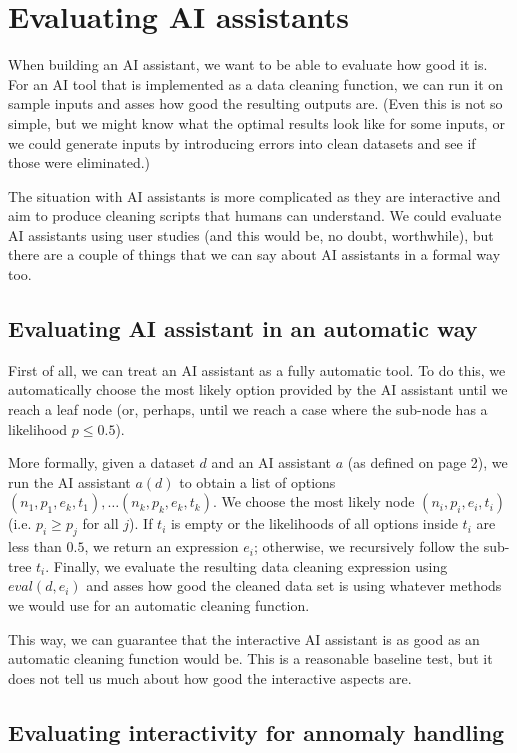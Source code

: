 \documentclass{article}
\begin{document}
\section{Evaluating AI assistants}

When building an AI assistant, we want to be able to evaluate how good it is. For an AI tool that 
is implemented as a data cleaning function, we can run it on sample inputs and asses how good 
the resulting outputs are. (Even this is not so simple, but we might know what the optimal results 
look like for some inputs, or we could generate inputs by introducing errors into clean datasets 
and see if those were eliminated.)

The situation with AI assistants is more complicated as they are interactive and aim to produce
cleaning scripts that humans can understand. We could evaluate AI assistants using user studies 
(and this would be, no doubt, worthwhile), but there are a couple of things that we can say about
AI assistants in a formal way too.

\subsection{Evaluating AI assistant in an automatic way}
First of all, we can treat an AI assistant as a fully automatic tool. To do this, we automatically
choose the most likely option provided by the AI assistant until we reach a leaf node (or, perhaps,
until we reach a case where the sub-node has a likelihood $p\leq 0.5$).

More formally, given a dataset $d$ and an AI assistant $a$ (as defined on page 2), we run the 
AI assistant $a(d)$ to obtain a list of options $(n_1, p_1, e_k, t_1), \ldots (n_k, p_k, e_k, t_k)$.
We choose the most likely node $(n_i, p_i, e_i, t_i)$ (i.e. $p_i \geq p_j$ for all $j$). If 
$t_i$ is empty or the likelihoods of all options inside $t_i$ are less than $0.5$, we return
an expression $e_i$; otherwise, we recursively follow the sub-tree $t_i$. Finally, we evaluate
the resulting data cleaning expression using $\mathit{eval}(d, e_i)$ and asses how good the 
cleaned data set is using whatever methods we would use for an automatic cleaning function.

This way, we can guarantee that the interactive AI assistant is as good as an automatic cleaning 
function would be. This is a reasonable baseline test, but it does not tell us much about how
good the interactive aspects are.

\subsection{Evaluating interactivity for annomaly handling}
\end{document}
